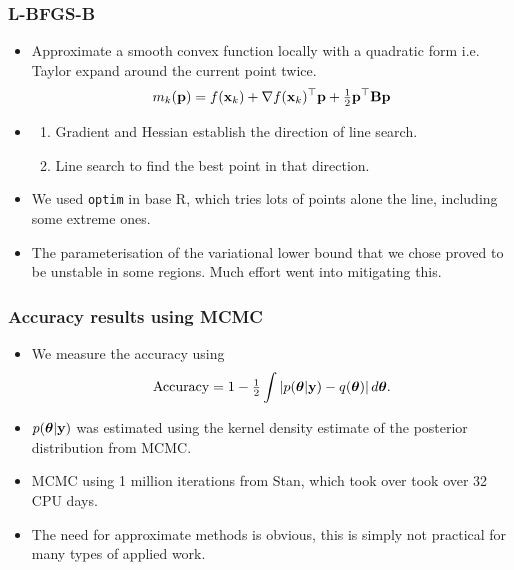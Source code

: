 \documentclass{beamer}
\begin{document}
\begin{frame}
	\frametitle{L-BFGS-B}
	\begin{itemize}
		\item Approximate a smooth convex function locally with a quadratic form i.e. Taylor expand around the current point twice.
			\[
				m_k({\bf p}) = f({\bf x}_k) + \nabla f({\bf x}_k)^\top {\bf p} + \tfrac{1}{2} {\bf p}^\top {\bf B} {\bf p}
			\]
		\item \begin{enumerate}
				\item Gradient and Hessian establish the direction of line search.
				\item Line search to find the best point in that direction.
		\end{enumerate}
		\item We used \texttt{optim} in base R, which tries lots of points alone the line, including some extreme 
					ones.
		\item The parameterisation of the variational lower bound that we chose proved to be unstable in some 
					regions. Much effort went into mitigating this.
	\end{itemize}
\end{frame}

\begin{frame}
	\frametitle{Accuracy results using MCMC}
	\begin{itemize}
		\item	We measure the accuracy using
					$$\text{Accuracy} = 1 - \tfrac{1}{2} \int \left |p({\boldsymbol \theta}|{\bf y}) - q({\boldsymbol \theta}) \right | d {\boldsymbol \theta}.$$
		\item	$p({\boldsymbol \theta}|{\bf y})$ was estimated using the kernel density estimate of the posterior
					distribution from MCMC.
		\item MCMC using 1 million iterations from Stan, which took over took over 32 CPU days.
		\item The need for approximate methods is obvious, this is simply not
		      practical for many types of applied work.
	\end{itemize}
\end{frame}
\end{document}
